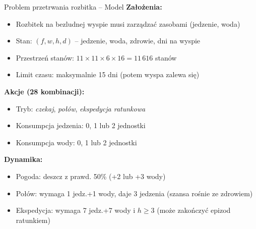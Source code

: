 \begin{frame}{Problem przetrwania rozbitka -- Model}
\textbf{Założenia:}
\begin{itemize}
    \item Rozbitek na bezludnej wyspie musi zarządzać zasobami (jedzenie, woda)
    \item Stan: $(f, w, h, d)$ -- jedzenie, woda, zdrowie, dni na wyspie
    \item Przestrzeń stanów: $11 \times 11 \times 6 \times 16 = 11\,616$ stanów
    \item Limit czasu: maksymalnie 15 dni (potem wyspa zalewa się)
\end{itemize}

\vspace{0.5em}
\textbf{Akcje (28 kombinacji):}
\begin{itemize}
    \item Tryb: \textit{czekaj}, \textit{połów}, \textit{ekspedycja ratunkowa}
    \item Konsumpcja jedzenia: 0, 1 lub 2 jednostki
    \item Konsumpcja wody: 0, 1 lub 2 jednostki
\end{itemize}

\vspace{0.5em}
\textbf{Dynamika:}
\begin{itemize}
    \item Pogoda: deszcz z prawd. 50\% (+2 lub +3 wody)
    \item Połów: wymaga 1 jedz.+1 wody, daje 3 jedzenia (szansa rośnie ze zdrowiem)
    \item Ekspedycja: wymaga 7 jedz.+7 wody i $h \ge 3$ (może zakończyć epizod ratunkiem)
\end{itemize}
\end{frame}

